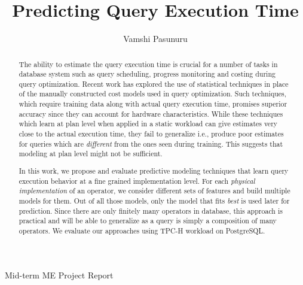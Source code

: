 \documentclass{article}
\title{\large \bf Predicting Query Execution Time }
\author{Vamshi Pasunuru}
\date{}
\begin{document}
	\maketitle
    \begin{center}
        Mid-term ME Project Report
    \end{center}
        \vskip 12pt
	\thispagestyle{empty}
	
	\begin{abstract}
	The ability to estimate the query execution time is crucial for a number of tasks in database system such as query scheduling, progress monitoring and costing during query optimization. Recent work has explored the use of statistical techniques in place of the manually constructed cost models used in query optimization. Such techniques, which require training data along with actual query execution time, promises superior accuracy since they can account for hardware characteristics. While these techniques which learn at plan level when applied in a static workload can give estimates very close to the actual execution time, they fail to generalize i.e., produce poor estimates for queries which are \textit{different} from the ones seen during training. This suggests that modeling at plan level might not be sufficient. 

In this work, we propose and evaluate predictive modeling techniques that learn query execution behavior at a fine grained implementation level. For each \textit{physical implementation} of an operator, we consider different sets of features and build multiple models for them. Out of all those models, only the model that fits \textit{best} is used later for prediction. Since there are only finitely many operators in database, this approach is practical and will be able to generalize as a query is simply a composition of many operators. We evaluate our approaches using TPC-H workload on PostgreSQL.

	\end{abstract}		
	\hfill 
\end{document}
